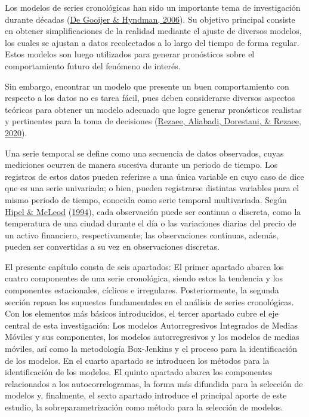 \documentclass[
]{article}
\begin{document}
Los modelos de series cronológicas han sido un importante tema de
investigación durante décadas (\protect\hyperlink{ref-tsa_decades}{De
Gooijer \& Hyndman, 2006}). Su objetivo principal consiste en obtener
simplificaciones de la realidad mediante el ajuste de diversos modelos,
los cuales se ajustan a datos recolectados a lo largo del tiempo de
forma regular. Estos modelos son luego utilizados para generar
pronósticos sobre el comportamiento futuro del fenómeno de interés.

Sin embargo, encontrar un modelo que presente un buen comportamiento con
respecto a los datos no es tarea fácil, pues deben considerarse diversos
aspectos teóricos para obtener un modelo adecuado que logre generar
pronósticos realistas y pertinentes para la toma de decisiones
(\protect\hyperlink{ref-tsa_decision_making}{Rezaee, Aliabadi,
Dorestani, \& Rezaee, 2020}).

Una serie temporal se define como una secuencia de datos observados,
cuyas mediciones ocurren de manera sucesiva durante un periodo de
tiempo. Los registros de estos datos pueden referirse a una única
variable en cuyo caso de dice que es una serie univariada; o bien,
pueden registrarse distintas variables para el mismo periodo de tiempo,
conocida como serie temporal multivariada. Según
\protect\hyperlink{ref-Hipel}{Hipel \& McLeod}
(\protect\hyperlink{ref-Hipel}{1994}), cada observación puede ser
continua o discreta, como la temperatura de una ciudad durante el día o
las variaciones diarias del precio de un activo financiero,
respectivamente; las observaciones continuas, además, pueden ser
convertidas a su vez en observaciones discretas.

El presente capítulo consta de seis apartados: El primer apartado abarca
los cuatro componentes de una serie cronológica, siendo estos la
tendencia y los componentes estacionales, cíclicos e irregulares.
Posteriormente, la segunda sección repasa los supuestos fundamentales en
el análisis de series cronológicas. Con los elementos más básicos
introducidos, el tercer apartado cubre el eje central de esta
investigación: Los modelos Autorregresivos Integrados de Medias Móviles
y sus componentes, los modelos autorregresivos y los modelos de medias
móviles, así como la metodología Box-Jenkins y el proceso para la
identificación de los modelos. En el cuarto apartado se introducen los
métodos para la identificación de los modelos. El quinto apartado abarca
los componentes relacionados a los autocorrelogramas, la forma más
difundida para la selección de modelos y, finalmente, el sexto apartado
introduce el principal aporte de este estudio, la sobreparametrización
como método para la selección de modelos.
\end{document}
